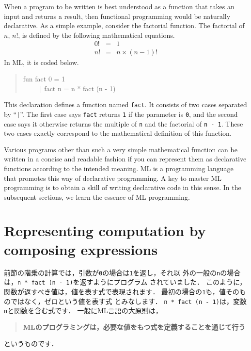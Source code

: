 \documentclass{jbook}
\newcommand{\txt}[2]{#2}
\begin{document}
	When a program to be written is best understood as a function
that takes an input and returns a result, then functional programming
would be naturally declarative.
	As a simple example, consider the factorial function.
	The factorial of $n$,  $n !$, is defined by the following mathematical
equations.
\begin{eqnarray*}
0 ! &=& 1
\\
n ! &=& n \times (n - 1) !
\end{eqnarray*}
In ML, it is coded below.
\begin{tt}
\begin{quote}
fun fact 0 = 1\\
\ \ \ \ \ | fact n = n * fact (n - 1)
\end{quote}
\end{tt}
	This declaration defines a function named {\tt fact}.
	It consists of two cases separated by ``{\tt |}''.
	The first case says {\tt fact} returns {\tt 1} if the parameter
is {\tt 0}, and the second case says it otherwise returns the multiple
of {\tt n} and the factorial of {\tt n - 1}.
	These two cases exactly correspond to the mathematical
definition of this function.
	
	
	Various programs other than such a very simple mathematical
function can be written in a concise and readable fashion if you
can represent them as declarative functions according to the intended
meaning.
	ML is a programming language that promotes this way of declarative
programming.
	A key to master ML programming is to obtain a skill of writing
declarative code in this sense.
	In the subsequent sections, we learn the essence of ML
programming.
\fi%

\section{
\txt{式の組み合わせによる計算の表現}
{Representing computation by composing expressions}
}
\label{sec:tutorialExpression}

\ifjp%
	前節の階乗の計算では，引数が{\tt 0}の場合は{\tt 1}を返し，それ以
外の一般の{\tt n}の場合は，{\tt n * fact (n - 1)}を返すようにプログラム
されていました．
	このように，関数が返すべき値は，値を表す式で表現されます．
	最初の場合の{\tt 1}も，値そのものではなく，ゼロという値を表す式
とみなします．
	{\tt n * fact (n - 1)}は，変数{\tt n}と関数を含む式です．
	一般にML言語の大原則は，
\begin{quote}
{\bf MLのプログラミングは，必要な値をもつ式を定義することを通じて行う}
\end{quote}
というものです．
\end{document}
